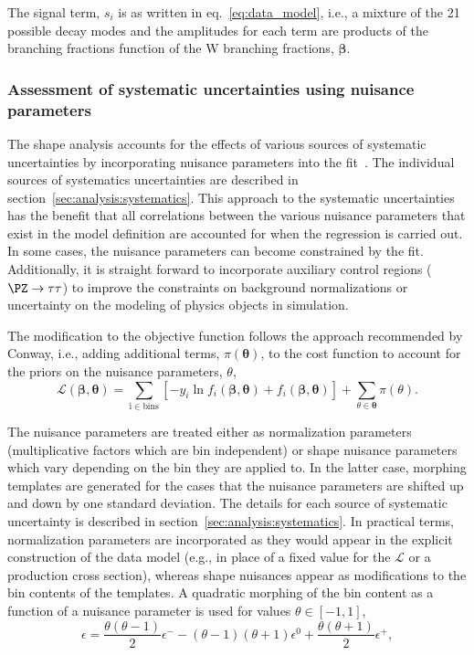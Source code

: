 The signal term, $s_{i}$ is as written in eq.~\ref{eq:data_model}, i.e.,
a mixture of the 21 possible decay modes and the amplitudes for each
term are products of the branching fractions function of the W branching
fractions, $\boldsymbol{\beta}$.  



\subsubsection{Assessment of systematic uncertainties using nuisance parameters}
\label{sec:analysis:shape_syst}

The shape analysis accounts for the effects of various sources of
systematic uncertainties by incorporating nuisance parameters into the
fit~\cite{Conway:2011in}.  The individual sources of systematics
uncertainties are described in section~\ref{sec:analysis:systematics}.  This
approach to the systematic uncertainties has the benefit that all
correlations between the various nuisance parameters that exist in the
model definition are accounted for when the regression is carried
out.  In some cases, the nuisance parameters can become constrained by
the fit.  Additionally, it is straight forward to incorporate auxiliary
control regions ($\PZ\rightarrow\tau\tau$) to improve the constraints on
background normalizations or uncertainty on the modeling of physics
objects in simulation.

The modification to the objective function follows the approach
recommended by Conway, i.e., adding additional terms,
$\pi(\boldsymbol{\theta})$, to the cost function to account for the
priors on the nuisance parameters, $\theta$,
\begin{equation}
\label{eq:nll_full}
    \mathcal{L}(\boldsymbol{\beta}, \boldsymbol{\theta}) =
    \sum_{\mathrm{i \in bins}} \left[-y_{i}\ln
    f_{i}(\boldsymbol{\beta}, \boldsymbol{\theta}) +
    f_{i}(\boldsymbol{\beta}, \boldsymbol{\theta})\right] +
    \sum_{\theta \in \boldsymbol{\theta}}\pi(\theta).
\end{equation}

The nuisance parameters are treated either as normalization parameters
(multiplicative factors which are bin independent) or shape nuisance
parameters which vary depending on the bin they are applied to.  In the
latter case, morphing templates are generated for the cases that the
nuisance parameters are shifted up and down by one standard deviation.
The details for each source of systematic uncertainty is described in
section~\ref{sec:analysis:systematics}.  In practical terms, normalization
parameters are incorporated as they would appear in the explicit
construction of the data model (e.g., in place of a fixed value for the
$\mathcal{L}$ or a production cross section), whereas shape nuisances
appear as modifications to the bin contents of the templates.  A
quadratic morphing of the bin content as a function of a nuisance
parameter is used for values $\theta \in [-1, 1]$,
\begin{equation}
\label{eq:shape_param}
    \epsilon = \frac{\theta(\theta - 1)}{2}\epsilon^{-} - (\theta - 1)(\theta +
    1)\epsilon^{0} + \frac{\theta(\theta + 1)}{2}\epsilon^{+},
\end{equation}


